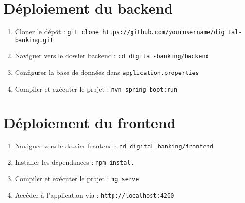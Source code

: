 \documentclass[12pt,a4paper]{report}
\begin{document}
\section{Déploiement du backend}

\begin{enumerate}
    \item Cloner le dépôt : \verb|git clone https://github.com/yourusername/digital-banking.git|
    \item Naviguer vers le dossier backend : \verb|cd digital-banking/backend|
    \item Configurer la base de données dans \verb|application.properties|
    \item Compiler et exécuter le projet : \verb|mvn spring-boot:run|
\end{enumerate}

\section{Déploiement du frontend}

\begin{enumerate}
    \item Naviguer vers le dossier frontend : \verb|cd digital-banking/frontend|
    \item Installer les dépendances : \verb|npm install|
    \item Compiler et exécuter le projet : \verb|ng serve|
    \item Accéder à l'application via : \verb|http://localhost:4200|
\end{enumerate}
\end{document}

